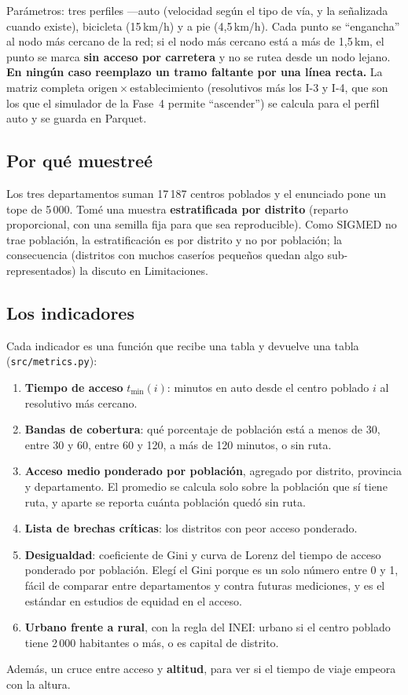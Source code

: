 \documentclass[12pt,a4paper]{article}
\begin{document}
Par\'ametros: tres perfiles ---auto (velocidad seg\'un el tipo de v\'ia, y
la se\~nalizada cuando existe), bicicleta (15\,km/h) y a pie (4{,}5\,km/h).
Cada punto se ``engancha'' al nodo m\'as cercano de la red; si el nodo
m\'as cercano est\'a a m\'as de 1{,}5\,km, el punto se marca \textbf{sin
acceso por carretera} y no se rutea desde un nodo lejano. \textbf{En ning\'un
caso reemplazo un tramo faltante por una l\'inea recta.} La matriz completa
origen\,$\times$\,establecimiento (resolutivos m\'as los \mbox{I-3} y
\mbox{I-4}, que son los que el simulador de la Fase~4 permite ``ascender'')
se calcula para el perfil auto y se guarda en Parquet.

\subsection{Por qu\'e muestre\'e}
Los tres departamentos suman 17\,187 centros poblados y el enunciado pone un
tope de 5\,000. Tom\'e una muestra \textbf{estratificada por distrito}
(reparto proporcional, con una semilla fija para que sea reproducible). Como
SIGMED no trae poblaci\'on, la estratificaci\'on es por distrito y no por
poblaci\'on; la consecuencia (distritos con muchos caser\'ios peque\~nos
quedan algo sub-representados) la discuto en Limitaciones.

\subsection{Los indicadores}
Cada indicador es una funci\'on que recibe una tabla y devuelve una tabla
(\texttt{src/metrics.py}):
\begin{enumerate}
\item \textbf{Tiempo de acceso} $t_{\min}(i)$: minutos en auto desde el centro
poblado $i$ al resolutivo m\'as cercano.
\item \textbf{Bandas de cobertura}: qu\'e porcentaje de poblaci\'on est\'a a
menos de 30, entre 30 y 60, entre 60 y 120, a m\'as de 120 minutos, o sin
ruta.
\item \textbf{Acceso medio ponderado por poblaci\'on}, agregado por distrito,
provincia y departamento. El promedio se calcula solo sobre la poblaci\'on
que s\'i tiene ruta, y aparte se reporta cu\'anta poblaci\'on qued\'o sin
ruta.
\item \textbf{Lista de brechas cr\'iticas}: los distritos con peor acceso
ponderado.
\item \textbf{Desigualdad}: coeficiente de Gini y curva de Lorenz del tiempo
de acceso ponderado por poblaci\'on. Eleg\'i el Gini porque es un solo
n\'umero entre 0 y 1, f\'acil de comparar entre departamentos y contra
futuras mediciones, y es el est\'andar en estudios de equidad en el acceso.
\item \textbf{Urbano frente a rural}, con la regla del INEI: urbano si el
centro poblado tiene 2\,000 habitantes o m\'as, o es capital de distrito.
\end{enumerate}
Adem\'as, un cruce entre acceso y \textbf{altitud}, para ver si el tiempo de
viaje empeora con la altura.
\end{document}
